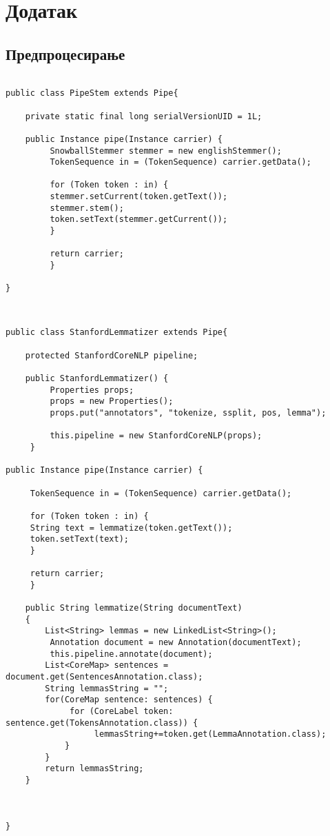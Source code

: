 \chapter{Додатак}

\section{Предпроцесирање}

\begin{lstlisting}

public class PipeStem extends Pipe{

	private static final long serialVersionUID = 1L;

	public Instance pipe(Instance carrier) {	
		 SnowballStemmer stemmer = new englishStemmer();
		 TokenSequence in = (TokenSequence) carrier.getData();

		 for (Token token : in) {
		 stemmer.setCurrent(token.getText());
		 stemmer.stem();
		 token.setText(stemmer.getCurrent());
		 }

		 return carrier;
		 }

}

\end{lstlisting}


\begin{lstlisting}


public class StanfordLemmatizer extends Pipe{

    protected StanfordCoreNLP pipeline;

    public StanfordLemmatizer() {
         Properties props;
         props = new Properties();
         props.put("annotators", "tokenize, ssplit, pos, lemma");

         this.pipeline = new StanfordCoreNLP(props);
     }

public Instance pipe(Instance carrier) {	
	
	 TokenSequence in = (TokenSequence) carrier.getData();

	 for (Token token : in) {
	 String text = lemmatize(token.getText());
	 token.setText(text);
	 }

	 return carrier;
	 }
	
    public String lemmatize(String documentText)
    {
        List<String> lemmas = new LinkedList<String>();
         Annotation document = new Annotation(documentText);
         this.pipeline.annotate(document);
        List<CoreMap> sentences = document.get(SentencesAnnotation.class);
        String lemmasString = "";
        for(CoreMap sentence: sentences) {
             for (CoreLabel token: sentence.get(TokensAnnotation.class)) {
                  lemmasString+=token.get(LemmaAnnotation.class);
            }
        }
        return lemmasString;
    }


   
}


\end{lstlisting}

